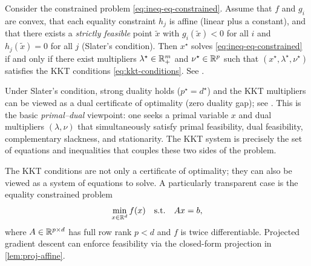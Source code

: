 \begin{theorem}
\label{thm:kkt-convex}
Consider the constrained problem \eqref{eq:ineq-eq-constrained}.
Assume that $f$ and $g_i$ are convex, that each equality constraint $h_j$ is affine (linear plus a constant), and that there exists a \emph{strictly feasible} point $\tilde x$ with $g_i(\tilde x)<0$ for all $i$ and $h_j(\tilde x)=0$ for all $j$ (Slater's condition).
Then $x^\star$ solves \eqref{eq:ineq-eq-constrained} if and only if there exist multipliers $\lambda^\star\in\mathbb{R}_+^m$ and $\nu^\star\in\mathbb{R}^p$ such that $(x^\star,\lambda^\star,\nu^\star)$ satisfies the KKT conditions \eqref{eq:kkt-conditions}.
See \citet[\S5.5.3]{boyd_vandenberghe_2004_convex}.
\end{theorem}

Under Slater's condition, strong duality holds ($p^\star=d^\star$) and the KKT multipliers can be viewed as a dual certificate of optimality (zero duality gap); see \citet[\S5.5.3]{boyd_vandenberghe_2004_convex}.
This is the basic \emph{primal--dual} viewpoint:
one seeks a primal variable $x$ and dual multipliers $(\lambda,\nu)$ that simultaneously satisfy primal feasibility, dual feasibility, complementary slackness, and stationarity.
The KKT system is precisely the set of equations and inequalities that couples these two sides of the problem.

The KKT conditions are not only a certificate of optimality; they can also be viewed as a system of equations to solve.
A particularly transparent case is the equality constrained problem
\begin{equation}
  \min_{x\in\mathbb{R}^d} f(x)
  \quad\text{s.t.}\quad
  Ax=b,
  \label{eq:equality-constrained}
\end{equation}
where $A\in\mathbb{R}^{p\times d}$ has full row rank $p<d$ and $f$ is twice differentiable.
Projected gradient descent can enforce feasibility via the closed-form projection in \cref{lem:proj-affine}.


